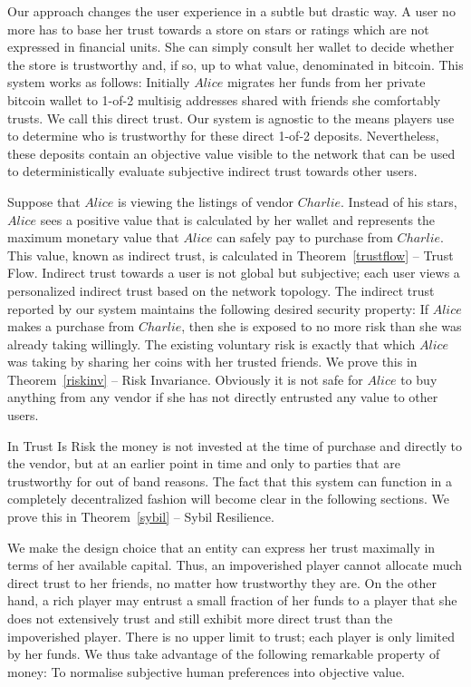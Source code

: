   Our approach changes the user experience in a subtle but drastic way. A user no more has to base her trust towards a
  store on stars or ratings which are not expressed in financial units. She can simply consult her wallet to decide whether
  the store is trustworthy and, if so, up to what value, denominated in bitcoin. This system works as follows: Initially
  $Alice$ migrates her funds from her private bitcoin wallet to 1-of-2 multisig addresses shared with friends she
  comfortably trusts. We call this direct trust. Our system is agnostic to the means players use to determine who is
  trustworthy for these direct 1-of-2 deposits. Nevertheless, these deposits contain an objective value visible to the network
  that can be used to deterministically evaluate subjective indirect trust towards other users.

  Suppose that $Alice$ is viewing the listings of vendor $Charlie$. Instead of his stars, $Alice$ sees a positive value that
  is calculated by her wallet and represents the maximum monetary value that $Alice$ can safely pay to purchase from
  $Charlie$. This value, known as indirect trust, is calculated in Theorem~\ref{trustflow} -- Trust Flow. Indirect trust
  towards a user is not global but subjective; each user views a personalized indirect trust based on the network topology.
  The indirect trust reported by our system maintains the following desired security property: If $Alice$ makes a purchase
  from $Charlie$, then she is exposed to no more risk than she was already taking willingly. The existing voluntary risk is
  exactly that which $Alice$ was taking by sharing her coins with her trusted friends. We prove this in Theorem~\ref{riskinv}
  -- Risk Invariance. Obviously it is not safe for $Alice$ to buy anything from any vendor if she has not directly entrusted
  any value to other users.

  In Trust Is Risk the money is not invested at the time of purchase and directly to the vendor, but at an earlier point in
  time and only to parties that are trustworthy for out of band reasons. The fact that this system can function in a
  completely decentralized fashion will become clear in the following sections. We prove this in Theorem~\ref{sybil} -- Sybil
  Resilience.

  We make the design choice that an entity can express her trust maximally in terms of her available capital. Thus, an
  impoverished player cannot allocate much direct trust to her friends, no matter how trustworthy they are. On the other hand,
  a rich player may entrust a small fraction of her funds to a player that she does not extensively trust and still exhibit
  more direct trust than the impoverished player. There is no upper limit to trust; each player is only limited by her funds.
  We thus take advantage of the following remarkable property of money: To normalise subjective human preferences into
  objective value.

